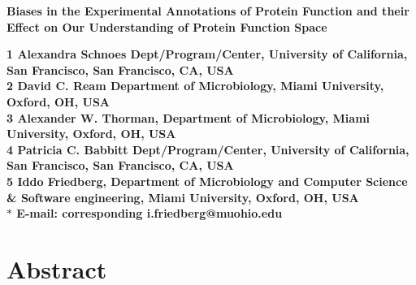 \documentclass[12pt]{article}
\date{}
\begin{document}
\begin{flushleft}
{\Large
\textbf{Biases in the Experimental Annotations of Protein Function and their Effect on Our
Understanding of Protein Function Space}
}
\\
\author{Alexandra Schnoes$^1$%
         David C. Ream$^2$%
      \and
         Alexander Thorman$^2$%
      \and
         Patricia Babbitt$^1$%
       \and 
        Iddo Friedberg\correspondingauthor$^{2,3}$%
      }
      

\bf{1} Alexandra Schnoes Dept/Program/Center, University of California, San Francisco, San Francisco, CA,
USA
\\
\bf{2} David C. Ream Department of Microbiology, Miami University, Oxford, OH, USA
\\
\bf{3} Alexander W. Thorman, Department of Microbiology, Miami University, Oxford, OH, USA
\\
\bf{4} Patricia C. Babbitt Dept/Program/Center, University of California, San Francisco, San Francisco, CA,
USA
\\
\bf{5} Iddo Friedberg, Department of Microbiology and Computer Science \& Software engineering, Miami University, Oxford, OH, USA
\\
$\ast$ E-mail: corresponding i.friedberg@muohio.edu
\end{flushleft}

\section*{Abstract}
\end{document}
